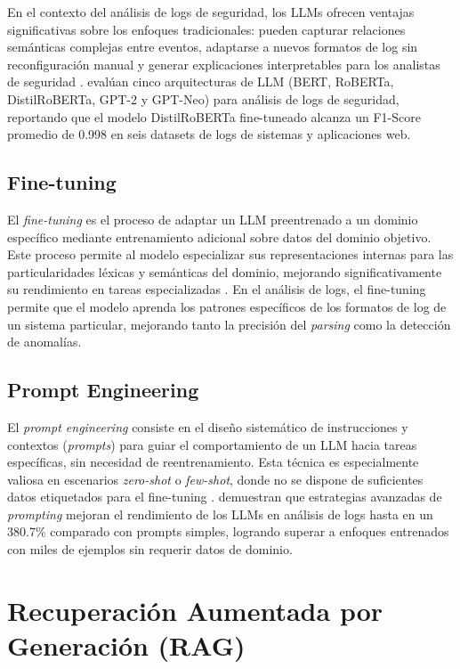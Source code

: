 En el contexto del análisis de logs de seguridad, los LLMs ofrecen ventajas significativas sobre los enfoques tradicionales: pueden capturar relaciones semánticas complejas entre eventos, adaptarse a nuevos formatos de log sin reconfiguración manual y generar explicaciones interpretables para los analistas de seguridad \cite{palma2025llm}. \cite{karlsen2023llm4sec} evalúan cinco arquitecturas de LLM (BERT, RoBERTa, DistilRoBERTa, GPT-2 y GPT-Neo) para análisis de logs de seguridad, reportando que el modelo DistilRoBERTa fine-tuneado alcanza un F1-Score promedio de 0.998 en seis datasets de logs de sistemas y aplicaciones web.

\subsection{Fine-tuning}

El \textit{fine-tuning} es el proceso de adaptar un LLM preentrenado a un dominio específico mediante entrenamiento adicional sobre datos del dominio objetivo. Este proceso permite al modelo especializar sus representaciones internas para las particularidades léxicas y semánticas del dominio, mejorando significativamente su rendimiento en tareas especializadas \cite{wang2024finellm}. En el análisis de logs, el fine-tuning permite que el modelo aprenda los patrones específicos de los formatos de log de un sistema particular, mejorando tanto la precisión del \textit{parsing} como la detección de anomalías.

\subsection{Prompt Engineering}

El \textit{prompt engineering} consiste en el diseño sistemático de instrucciones y contextos (\textit{prompts}) para guiar el comportamiento de un LLM hacia tareas específicas, sin necesidad de reentrenamiento. Esta técnica es especialmente valiosa en escenarios \textit{zero-shot} o \textit{few-shot}, donde no se dispone de suficientes datos etiquetados para el fine-tuning \cite{liu2024logprompt}. \cite{liu2024logprompt} demuestran que estrategias avanzadas de \textit{prompting} mejoran el rendimiento de los LLMs en análisis de logs hasta en un 380.7\% comparado con prompts simples, logrando superar a enfoques entrenados con miles de ejemplos sin requerir datos de dominio.

\section{Recuperación Aumentada por Generación (RAG)}

